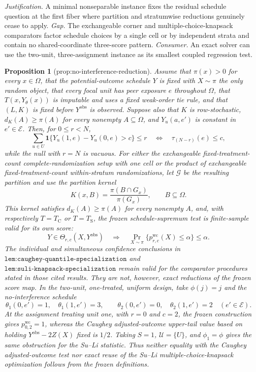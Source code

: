 \documentclass{article}
\newtheorem{proposition}{Proposition}
\begin{document}
\par\smallskip\noindent \textit{Justification.} A minimal nonseparable instance fixes the residual schedule question at the first fiber where partition and stratumwise reductions genuinely cease to apply. \textit{Gap.} The exchangeable corner and multiple-choice-knapsack comparators factor schedule choices by a single cell or by independent strata and contain no shared-coordinate three-score pattern. \textit{Consumer.} An exact solver can use the two-unit, three-assignment instance as its smallest coupled regression test.

\begin{proposition}[prop:no-interference-reduction]\label{prop:no-interference-reduction}
Assume that \(\pi(x)>0\) for every \(x\in\Omega\), that the potential-outcome schedule \(Y\) is fixed with \(X\sim\pi\) the only random object, that every focal unit has peer exposure \(e\) throughout \(\Omega\), that \(T(x,Y_{\theta}(x))\) is imputable and uses a fixed weak-order tie rule, and that \((L,K)\) is fixed before \(Y^{\mathrm{obs}}\) is observed.  Suppose also that \(K\) is row-stochastic, \(d_K(A)\geq\pi(A)\) for every nonempty \(A\subseteq\Omega\), and \(Y_u(a,e')\) is constant in \(e'\in\mathcal E\).  Then, for \(0\leq r<N\),
\[
 \sum_{u\in U}\mathbf 1\{Y_u(1,e)-Y_u(0,e)>c\}\leq r
 \quad\Longleftrightarrow\quad
 \tau_{(N-r)}(e)\leq c,
\]
while the null with \(r=N\) is vacuous.  For either the exchangeable fixed-treatment-count complete-randomization setup with one cell or the product of exchangeable fixed-treatment-count within-stratum randomizations, let \(\mathcal G\) be the resulting partition and use the partition kernel
\[
 K(x,B)=\frac{\pi(B\cap G_x)}{\pi(G_x)},\qquad B\subseteq\Omega.
\]
This kernel satisfies \(d_K(A)\geq\pi(A)\) for every nonempty \(A\), and, with respectively \(T=T_{\mathrm C}\) or \(T=T_{\mathrm S}\), the frozen schedule-supremum test is finite-sample valid for its own score:
\[
 Y\in\Theta_{r,c}(X,Y^{\mathrm{obs}})
 \quad\Longrightarrow\quad
 \Pr_{X\sim\pi}\{p^{\mathrm{wc}}_{r,c}(X)\leq\alpha\}\leq\alpha.
\]
The individual and simultaneous confidence conclusions in \(\texttt{lem:caughey-quantile-specialization}\) and \(\texttt{lem:suli-knapsack-specialization}\) remain valid for the comparator procedures stated in those cited results.  They are not, however, exact reductions of the frozen score map.  In the two-unit, one-treated, uniform design, take \(\phi(j)=j\) and the no-interference schedule
\[
 \theta_1(0,e')=1,\quad \theta_1(1,e')=3,
 \qquad
 \theta_2(0,e')=0,\quad \theta_2(1,e')=2
 \quad(e'\in\mathcal E).
\]
At the assignment treating unit one, with \(r=0\) and \(c=2\), the frozen construction gives \(p^{\mathrm{wc}}_{0,2}=1\), whereas the Caughey adjusted-outcome upper-tail value based on holding \(Y^{\mathrm{obs}}-2Z(X)\) fixed is \(1/2\).  Taking \(S=1\), \(\mathcal U=\{U\}\), and \(\phi_1=\phi\) gives the same obstruction for the Su--Li statistic.  Thus neither equality with the Caughey adjusted-outcome test nor exact reuse of the Su--Li multiple-choice-knapsack optimization follows from the frozen definitions.
\end{proposition}
\end{document}
